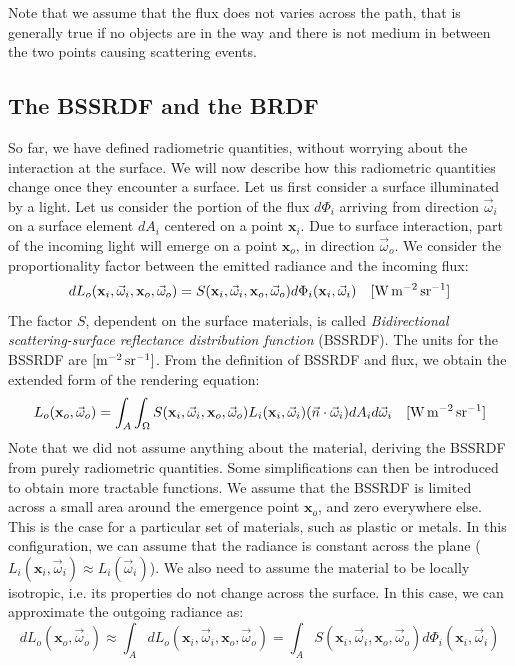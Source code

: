 Note that we assume that the flux does not varies across the path, that is generally true if no objects are in the way and there is not medium in between the two points causing scattering events. 

\subsection{The BSSRDF and the BRDF}
So far, we have defined radiometric quantities, without worrying about the interaction at the surface. We will now describe how this radiometric quantities change once they encounter a surface. Let us first consider a surface illuminated by a light. Let us consider the portion of the flux $d \Phi_i$ arriving from direction $\vec{\omega}_i$ on a surface element $d A_i$ centered on a point $\mathbf{x}_i$. Due to surface interaction, part of the incoming light will emerge on a point $\mathbf{x}_o$, in direction $\vec{\omega}_o$. We consider the proportionality factor between the emitted radiance and the incoming flux:
$$
d L_o(\mathbf{x}_i, \vec{\omega}_i, \mathbf{x}_o, \vec{\omega}_o) = S(\mathbf{x}_i, \vec{\omega}_i, \mathbf{x}_o, \vec{\omega}_o) d \Phi_i(\mathbf{x}_i, \vec{\omega}_i)  \siunit{\watt \per \square \metre \per \steradian}
$$
The factor $S$, dependent on the surface materials, is called \emph{Bidirectional scattering-surface reflectance distribution function} (BSSRDF). The units for the BSSRDF are $\siunitnospace{\per \square \metre \per \steradian}$. From the definition of BSSRDF and flux, we obtain the extended form of the rendering equation:
$$
L_o(\mathbf{x}_o, \vec{\omega}_o) = \int_A \int_\Omega S(\mathbf{x}_i, \vec{\omega}_i, \mathbf{x}_o, \vec{\omega}_o) L_i(\mathbf{x}_i, \vec{\omega}_i) (\vec{n} \cdot \vec{\omega}_i) d A_i d \vec{\omega}_i  \siunit{\watt \per \square \metre \per \steradian}
$$
Note that we did not assume anything about the material, deriving the BSSRDF from purely radiometric quantities. Some simplifications can then be introduced to obtain more tractable functions. We assume that the BSSRDF is limited across a small area around the emergence point $\mathbf{x}_o$, and zero everywhere else. This is the case for a particular set of materials, such as plastic or metals. In this configuration, we can assume that the radiance is constant across the plane ($L_i(\mathbf{x}_i, \vec{\omega}_i) \approx L_i(\vec{\omega}_i)$). We also need to assume the material to be locally isotropic, i.e. its properties do not change across the surface. In this case, we can approximate the outgoing radiance as:
$$
d L_o(\mathbf{x}_o, \vec{\omega}_o) \approx \int_A d L_o(\mathbf{x}_i, \vec{\omega}_i, \mathbf{x}_o, \vec{\omega}_o) = \int_A S(\mathbf{x}_i, \vec{\omega}_i, \mathbf{x}_o, \vec{\omega}_o) d \Phi_i(\mathbf{x}_i, \vec{\omega}_i) 
$$
